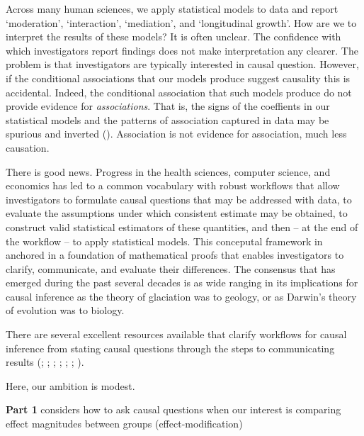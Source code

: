 \documentclass[
  single column]{article}
\begin{document}
Across many human sciences, we apply statistical models to data and
report `moderation', `interaction', `mediation', and `longitudinal
growth'. How are we to interpret the results of these models? It is
often unclear. The confidence with which investigators report findings
does not make interpretation any clearer. The problem is that
investigators are typically interested in causal question. However, if
the conditional associations that our models produce suggest causality
this is accidental. Indeed, the conditional association that such models
produce do not provide evidence for \emph{associations}. That is, the
signs of the coeffients in our statistical models and the patterns of
association captured in data may be spurious and inverted
().
Association is not evidence for association, much less causation.

There is good news. Progress in the health sciences, computer science,
and economics has led to a common vocabulary with robust workflows that
allow investigators to formulate causal questions that may be addressed
with data, to evaluate the assumptions under which consistent estimate
may be obtained, to construct valid statistical estimators of these
quantities, and then -- at the end of the workflow -- to apply
statistical models. This conceputal framework in anchored in a
foundation of mathematical proofs that enables investigators to clarify,
communicate, and evaluate their differences. The consensus that has
emerged during the past several decades is as wide ranging in its
implications for causal inference as the theory of glaciation was to
geology, or as Darwin's theory of evolution was to biology.

There are several excellent resources available that clarify workflows
for causal inference from stating causal questions through the steps to
communicating results (; ;
;
;
; ; ).

Here, our ambition is modest.

\textbf{Part 1} considers how to ask causal questions when our interest
is comparing effect magnitudes between groups (effect-modification)
\end{document}
